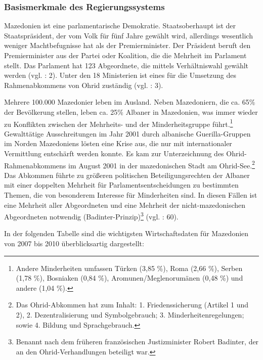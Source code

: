 \subsubsection{Basismerkmale des Regierungssystems}

Mazedonien ist eine parlamentarische Demokratie. Staatsoberhaupt ist der Staatspräsident, der vom Volk für fünf Jahre gewählt wird, allerdings wesentlich weniger Machtbefugnisse hat als der Premierminister. Der Präsident beruft den Premierminister aus der Partei oder Koalition, die die Mehrheit im Parlament stellt. Das Parlament hat 123 Abgeordnete, die mittels Verhältniswahl gewählt werden (vgl. \cite{osceodihr11} : 2). Unter den 18 Ministerien ist eines für die Umsetzung des Rahmenabkommens von Ohrid zuständig (vgl. \cite{markic} : 3).\par
Mehrere 100.000 Mazedonier leben im Ausland. Neben Mazedoniern, die ca. 65\% der Bevölkerung stellen, leben ca. 25\% Albaner in Mazedonien, was immer wieder zu Konflikten zwischen der Mehrheits- und der Minderheitsgruppe führt.\footnote{Andere Minderheiten umfassen Türken (3,85 \%), Roma (2,66 \%), Serben (1,78 \%), Bosniaken (0,84 \%), Aromunen/Meglenorumänen (0,48 \%) und andere (1,04 \%).} Gewalttätige Ausschreitungen im Jahr 2001 durch albanische Guerilla-Gruppen im Norden Mazedoniens lösten eine Krise aus, die nur mit internationaler Vermittlung entschärft werden konnte. Es kam zur Unterzeichnung des Ohrid-Rahmenabkommens im August 2001 in der mazedonischen Stadt am Ohrid-See.\footnote{Das Ohrid-Abkommen hat zum Inhalt: 1. Friedenssicherung (Artikel 1 und 2), 2. Dezentralisierung und Symbolgebrauch; 3. Minderheitenregelungen; sowie 4. Bildung und Sprachgebrauch.} Das Abkommen führte zu größeren politischen Beteiligungsrechten der Albaner mit einer doppelten Mehrheit für Parlamentsentscheidungen zu bestimmten Themen, die von besonderem Interesse für Minderheiten sind. In diesen Fällen ist eine Mehrheit aller Abgeordneten und eine Mehrheit der nicht-mazedonischen Abgeordneten notwendig (Badinter-Prinzip)\footnote{Benannt nach dem früheren französischen Justizminister Robert Badinter, der an den Ohrid-Verhandlungen beteiligt war.} (vgl. \cite{szpala} : 60).\par
In der folgenden Tabelle sind die wichtigsten Wirtschaftsdaten für Mazedonien von 2007 bis 2010 überblicksartig dargestellt:
